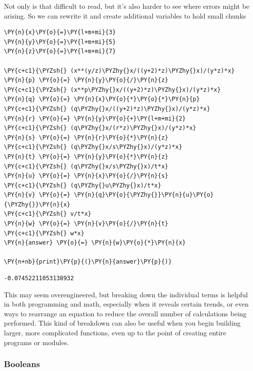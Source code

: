     Not only is that difficult to read, but it's also harder to see where
errors might be arising. So we can rewrite it and create additional
variables to hold small chunks

    \begin{tcolorbox}[breakable, size=fbox, boxrule=1pt, pad at break*=1mm,colback=cellbackground, colframe=cellborder]
\begin{Verbatim}[commandchars=\\\{\}]
\PY{n}{x}\PY{o}{=}\PY{l+m+mi}{3}
\PY{n}{y}\PY{o}{=}\PY{l+m+mi}{5}
\PY{n}{z}\PY{o}{=}\PY{l+m+mi}{7}

\PY{c+c1}{\PYZsh{} (x**(y/z)\PYZhy{}x/((y+2)*z)\PYZhy{}x)/(y*z)*x}
\PY{n}{p} \PY{o}{=} \PY{n}{y}\PY{o}{/}\PY{n}{z}
\PY{c+c1}{\PYZsh{} (x**p\PYZhy{}x/((y+2)*z)\PYZhy{}x)/(y*z)*x}
\PY{n}{q} \PY{o}{=} \PY{n}{x}\PY{o}{*}\PY{o}{*}\PY{n}{p}
\PY{c+c1}{\PYZsh{} (q\PYZhy{}x/((y+2)*z)\PYZhy{}x)/(y*z)*x}
\PY{n}{r} \PY{o}{=} \PY{n}{y}\PY{o}{+}\PY{l+m+mi}{2}
\PY{c+c1}{\PYZsh{} (q\PYZhy{}x/(r*z)\PYZhy{}x)/(y*z)*x}
\PY{n}{s} \PY{o}{=} \PY{n}{r}\PY{o}{*}\PY{n}{z}
\PY{c+c1}{\PYZsh{} (q\PYZhy{}x/s\PYZhy{}x)/(y*z)*x}
\PY{n}{t} \PY{o}{=} \PY{n}{y}\PY{o}{*}\PY{n}{z}
\PY{c+c1}{\PYZsh{} (q\PYZhy{}x/s\PYZhy{}x)/t*x}
\PY{n}{u} \PY{o}{=} \PY{n}{x}\PY{o}{/}\PY{n}{s}
\PY{c+c1}{\PYZsh{} (q\PYZhy{}u\PYZhy{}x)/t*x}
\PY{n}{v} \PY{o}{=} \PY{n}{q}\PY{o}{\PYZhy{}}\PY{n}{u}\PY{o}{\PYZhy{}}\PY{n}{x}
\PY{c+c1}{\PYZsh{} v/t*x}
\PY{n}{w} \PY{o}{=} \PY{n}{v}\PY{o}{/}\PY{n}{t}
\PY{c+c1}{\PYZsh{} w*x}
\PY{n}{answer} \PY{o}{=} \PY{n}{w}\PY{o}{*}\PY{n}{x}

\PY{n+nb}{print}\PY{p}{(}\PY{n}{answer}\PY{p}{)}
\end{Verbatim}
\end{tcolorbox}

    \begin{Verbatim}[commandchars=\\\{\}]
-0.07452211053138932
    \end{Verbatim}

    This may seem overengineered, but breaking down the individual terms is
helpful in both programming and math, especially when it reveals certain
trends, or even ways to rearrange an equation to reduce the overall
number of calculations being performed. This kind of breakdown can also
be useful when you begin building larger, more complicated functions,
even up to the point of creating entire programs or modules.

\hypertarget{booleans}{%
\subsubsection{Booleans}\label{booleans}}


